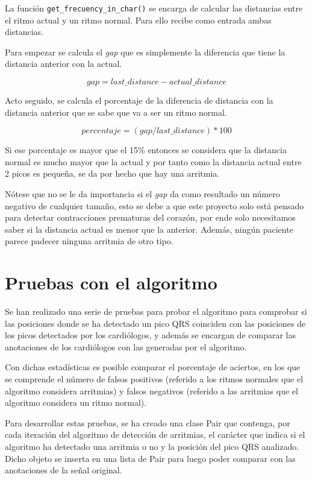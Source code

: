 \FloatBarrier

La función \texttt{get\_frecuency\_in\_char()} se encarga de calcular las distancias entre el ritmo actual y un ritmo normal. 
Para ello recibe como entrada ambas distancias.

Para empezar se calcula el  \textit{gap}  que es simplemente la diferencia que tiene la distancia anterior con la actual.

\[gap = last\_distance - actual\_distance\]

Acto seguido, se calcula el porcentaje de la diferencia de distancia con la distancia anterior que se sabe que va a ser 
un ritmo normal.

\[percentaje = (gap / last\_distance) * 100\]

Si ese porcentaje es mayor que el 15\% entonces se considera que la distancia normal es mucho mayor que la actual
y por tanto como la distancia actual entre 2 picos es pequeña, se da por hecho que hay una arritmia.

Nótese que no se le da importancia si el  \textit{gap}  da como resultado un número negativo de cualquier tamaño, esto se debe
a que este proyecto solo está pensado para detectar contracciones prematuras del corazón, por ende solo necesitamos 
saber si la distancia actual es menor que la anterior. Además, ningún paciente parece padecer ninguna arritmia de otro
tipo.

\section{Pruebas con el algoritmo}

Se han realizado una serie de pruebas para probar el algoritmo para comprobar si las posiciones donde
se ha detectado un pico QRS coinciden con las posiciones de los picos detectados por los cardiólogos, y además se 
encargan de comparar las anotaciones de los cardiólogos con las generadas por el algoritmo.

Con dichas estadísticas es posible comparar el porcentaje de aciertos, en los que se comprende el número de 
falsos positivos (referido a los ritmos normales que el algoritmo considera arritmias) y 
falsos negativos (referido a las arritmias que el algoritmo considera un ritmo normal).

Para desarrollar estas pruebas, se ha creado una clase Pair que contenga, por cada iteración del algoritmo de detección de arritmias, el carácter que indica si el algoritmo ha detectado una arritmia o no y la posición del pico QRS analizado. Dicho objeto se inserta en una lista de Pair para luego poder comparar con las anotaciones de la señal original.

